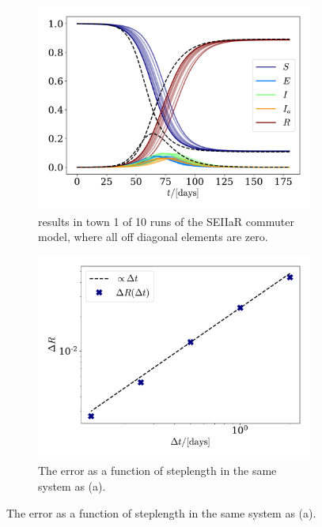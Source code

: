\documentclass{article}
\begin{document}
    \begin{figure}[H]
        \centering
        \begin{subfigure}{.49\textwidth}
            \includegraphics[width=\textwidth]{../plots/2D/TestSEIIaR_commute.pdf}
            \caption{results in town 1 of 10 runs of the SEIIaR commuter model, where all off diagonal elements are zero.}
            \label{SEIIaR commute}
        \end{subfigure}
        \begin{subfigure}{.49\textwidth}
            \includegraphics[width=\textwidth]{../plots/2D/conv.pdf}
            \caption{The error as a function of steplength in the same system as (a).}
            \label{SEIIaR commute conv}
        \end{subfigure}
    \end{figure}
\end{document}
